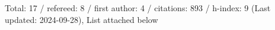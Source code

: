 Total: 17 / refereed: 8 / first author: 4 / citations: 893 / h-index: 9 (Last updated: 2024-09-28), List attached below